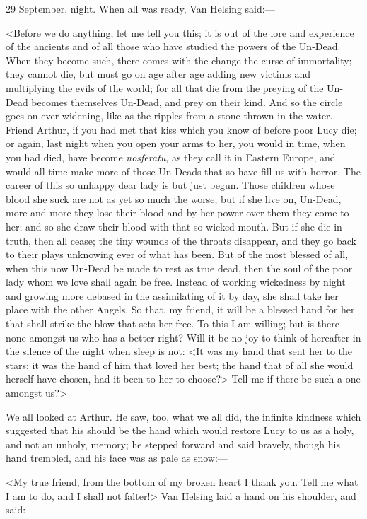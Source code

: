 \begin{diary}{29 September, night.}
When all was ready, Van Helsing said:—

<Before we do anything, let me tell you this; it is out of the lore and experience of the ancients and of all those who have studied the powers of the Un-Dead. When they become such, there comes with the change the curse of immortality; they cannot die, but must go on age after age adding new victims and multiplying the evils of the world; for all that die from the preying of the Un-Dead becomes themselves Un-Dead, and prey on their kind. And so the circle goes on ever widening, like as the ripples from a stone thrown in the water. Friend Arthur, if you had met that kiss which you know of before poor Lucy die; or again, last night when you open your arms to her, you would in time, when you had died, have become \textit{nosferatu}, as they call it in Eastern Europe, and would all time make more of those Un-Deads that so have fill us with horror. The career of this so unhappy dear lady is but just begun. Those children whose blood she suck are not as yet so much the worse; but if she live on, Un-Dead, more and more they lose their blood and by her power over them they come to her; and so she draw their blood with that so wicked mouth. But if she die in truth, then all cease; the tiny wounds of the throats disappear, and they go back to their plays unknowing ever of what has been. But of the most blessed of all, when this now Un-Dead be made to rest as true dead, then the soul of the poor lady whom we love shall again be free. Instead of working wickedness by night and growing more debased in the assimilating of it by day, she shall take her place with the other Angels. So that, my friend, it will be a blessed hand for her that shall strike the blow that sets her free. To this I am willing; but is there none amongst us who has a better right? Will it be no joy to think of hereafter in the silence of the night when sleep is not: <It was my hand that sent her to the stars; it was the hand of him that loved her best; the hand that of all she would herself have chosen, had it been to her to choose?> Tell me if there be such a one amongst us?>

We all looked at Arthur. He saw, too, what we all did, the infinite kindness which suggested that his should be the hand which would restore Lucy to us as a holy, and not an unholy, memory; he stepped forward and said bravely, though his hand trembled, and his face was as pale as snow:—

<My true friend, from the bottom of my broken heart I thank you. Tell me what I am to do, and I shall not falter!> Van Helsing laid a hand on his shoulder, and said:—


\end{diary}
